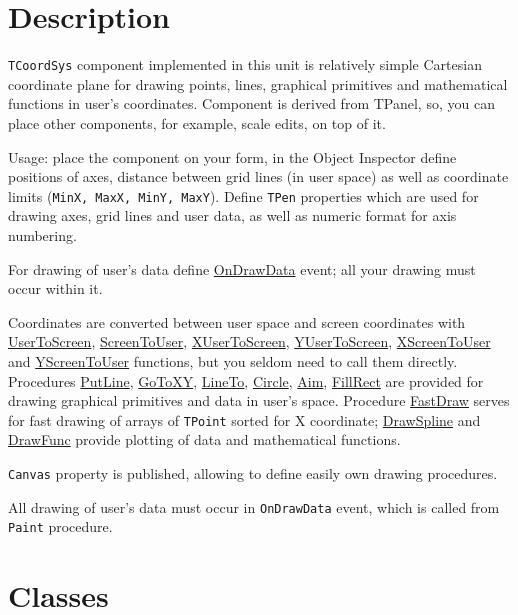 \documentclass[12pt,a4paper,oneside]{report}
\newcommand{\code}[1]{\texttt{#1}}
\begin{document}
\section{Description}
\code{TCoordSys} component implemented in this unit is relatively simple Cartesian coordinate plane for drawing points, lines, graphical primitives and mathematical functions in user's coordinates. Component is derived from TPanel, so, you can place other components, for example, scale edits, on top of it.

Usage: place the component on your form, in the Object Inspector define positions of axes, distance between grid lines (in user space) as well as coordinate limits (\code{MinX, MaxX, MinY, MaxY}). Define \code{TPen} properties which are used for drawing axes, grid lines and user data, as well as numeric format for axis numbering.

For drawing of user's data define \hyperref[lmcoordsys.TCoordSys-OnDrawData]{OnDrawData} event; all your drawing must occur within it. 

Coordinates are converted between user space and screen coordinates with \hyperref[lmcoordsys.TCoordSys-UserToScreen]{UserToScreen}, \hyperref[lmcoordsys.TCoordSys-ScreenToUser]{ScreenToUser}, \hyperref[lmcoordsys.TCoordSys-XUserToScreen]{XUserToScreen}, \hyperref[lmcoordsys.TCoordSys-YScreenToUser]{YUserToScreen}, \hyperref[lmcoordsys.TCoordSys-XScreenToUser]{XScreenToUser} and \hyperref[lmcoordsys.TCoordSys-YScreenToUser]{YScreenToUser} functions, but you seldom need to call them directly. Procedures \hyperref[lmcoordsys.TCoordSys-PutLine]{PutLine}, \hyperref[lmcoordsys.TCoordSys-GoToXY]{GoToXY}, \hyperref[lmcoordsys.TCoordSys-LineTo]{LineTo}, \hyperref[lmcoordsys.TCoordSys-Circle]{Circle}, \hyperref[lmcoordsys.TCoordSys-Aim]{Aim}, \hyperref[lmcoordsys.TCoordSys-FillRect]{FillRect} are provided for drawing graphical primitives and data in user's space. Procedure \hyperref[lmcoordsys.TCoordSys-FastDraw]{FastDraw} serves for fast drawing of arrays of \code{TPoint} sorted for X coordinate; \hyperref[lmcoordsys.TCoordSys-DrawSpline]{DrawSpline} and \hyperref[lmcoordsys.TCoordSys-DrawFunc]{DrawFunc} provide plotting of data and mathematical functions.

\code{Canvas} property is published, allowing to define easily own drawing procedures.

All drawing of user's data must occur in \code{OnDrawData} event, which is called from \code{Paint} procedure.  
\section{Classes}
\end{document}
